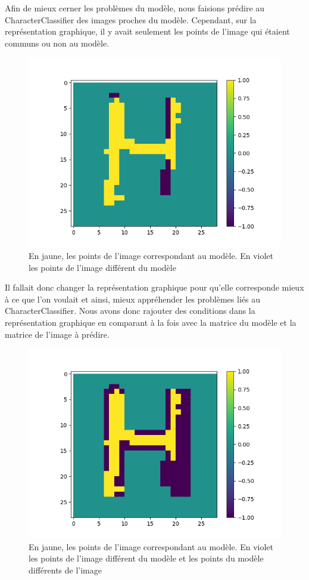 \documentclass[a4paper, 12pt]{article}
\begin{document}
Afin de mieux cerner les problèmes du modèle, nous faisions prédire au CharacterClassifier des images proches du modèle.
Cependant, sur la représentation graphique, il y avait seulement les points de l'image qui étaient communs ou non au modèle.
\begin{figure}[!ht]
\centering
\includegraphics[scale=0.55]{img/pix_cora0.png}
\caption{En jaune, les points de l'image correspondant au modèle. En violet les points de l'image différent du modèle}
\end{figure}

Il fallait donc changer la représentation graphique pour qu'elle corresponde mieux à ce que l'on voulait et ainsi, mieux appréhender les problèmes liés au CharacterClassifier. Nous avons donc rajouter des conditions dans la représentation graphique en comparant à la fois avec la matrice du modèle et la matrice de l’image à prédire.

\begin{figure}[!ht]
\centering
\includegraphics[scale=0.55]{img/pix_cor0.png}
\caption{En jaune, les points de l'image correspondant au modèle. En violet les points de l'image différent du modèle et les points du modèle différents de l'image}
\end{figure}
\end{document}
